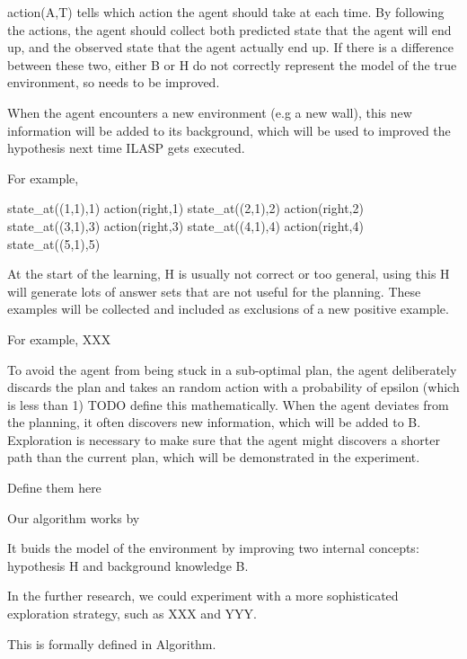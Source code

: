 action(A,T) tells which action the agent should take at each time. By following the actions, the agent should collect both predicted state that the 
agent will end up, and the observed state that the agent actually end up. If there is a difference between these two, either B or H do not correctly represent
the model of the true environment, so needs to be improved. 

When the agent encounters a new environment (e.g a new wall), this new information will be added to its background, which will be used to improved the hypothesis 
next time ILASP gets executed. 

For example, 

state\_at((1,1),1) action(right,1)
state\_at((2,1),2) action(right,2)
state\_at((3,1),3) action(right,3)
state\_at((4,1),4) action(right,4)
state\_at((5,1),5)


At the start of the learning, H is usually not correct or too general, using this H will generate lots of answer sets that are not useful for the planning. 
These examples will be collected and included as exclusions of a new positive example. 

For example, 
XXX


To avoid the agent from being stuck in a sub-optimal plan, the agent deliberately discards the plan and takes an random action with a probability of 
epsilon (which is less than 1) TODO define this mathematically. 
When the agent deviates from the planning, it often discovers new information, which will be added to B.
Exploration is necessary to make sure that the agent might discovers a shorter path than the current plan, which will be demonstrated in the experiment. 

Define them here

Our algorithm works by 

It buids the model of the environment by improving two internal concepts: hypothesis H and background knowledge B. 


In the further research, we could experiment with a more sophisticated exploration strategy, such as XXX and YYY. 


This is formally defined in Algorithm. 

